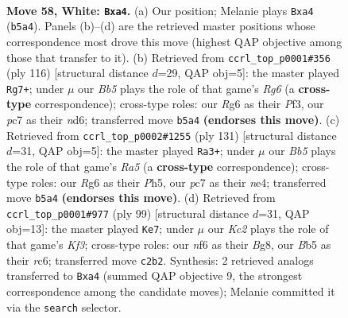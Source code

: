 \documentclass[11pt]{article}
\begin{document}
\clearpage

\begin{figure}[p]\centering
\begin{subfigure}{0.46\textwidth}\centering
\resizebox{\linewidth}{!}{%
\newchessgame
\chessboard[
  setfen={2k5/p1p5/5nR1/1B3p2/r4P2/4B3/2K4P/8 w - - 2 58},
  showmover=false,
  pgfstyle=straightmove, color=movearrow, markmove={b5-a4}
]}
\caption{}
\end{subfigure}\hfill
\begin{subfigure}{0.46\textwidth}\centering
\resizebox{\linewidth}{!}{%
\newchessgame
\chessboard[
  setfen={8/p1k5/P2n2R1/r5p1/8/5P2/7K/5B2 w - - 18 59},
  showmover=false,
  pgfstyle=straightmove, color=movearrow, markmove={g6-g7}
]}
\caption{}
\end{subfigure}
\\[4pt]
\begin{subfigure}{0.46\textwidth}\centering
\resizebox{\linewidth}{!}{%
\newchessgame
\chessboard[
  setfen={8/2P2R2/2k5/7p/r3N1bP/4KpP1/8/8 b - - 18 66},
  showmover=false,
  pgfstyle=straightmove, color=movearrow, markmove={a4-a3}
]}
\caption{}
\end{subfigure}\hfill
\begin{subfigure}{0.46\textwidth}\centering
\resizebox{\linewidth}{!}{%
\newchessgame
\chessboard[
  setfen={6b1/8/2R2k2/p4P2/2P1K2p/4B3/2P5/3r4 b - - 1 50},
  showmover=false,
  pgfstyle=straightmove, color=movearrow, markmove={f6-e7}
]}
\caption{}
\end{subfigure}
\caption{\textbf{Move 58, White: \texttt{Bxa4}.} (a) Our position; Melanie plays \texttt{Bxa4} (\texttt{b5a4}). Panels (b)--(d) are the retrieved master positions whose correspondence most drove this move (highest QAP objective among those that transfer to it). (b) Retrieved from \texttt{ccrl\_top\_p0001\#356} (ply 116) [structural distance $d$=29, QAP obj=5]: the master played \texttt{Rg7+}; under $\mu$ our \emph{Bb5} plays the role of that game's \emph{Rg6} (a \textbf{cross-type} correspondence); cross-type roles: our \emph{R}g6 as their \emph{P}f3, our \emph{p}c7 as their \emph{n}d6; transferred move \texttt{b5a4} \textbf{(endorses this move)}. (c) Retrieved from \texttt{ccrl\_top\_p0002\#1255} (ply 131) [structural distance $d$=31, QAP obj=5]: the master played \texttt{Ra3+}; under $\mu$ our \emph{Bb5} plays the role of that game's \emph{Ra5} (a \textbf{cross-type} correspondence); cross-type roles: our \emph{R}g6 as their \emph{P}h5, our \emph{p}c7 as their \emph{n}e4; transferred move \texttt{b5a4} \textbf{(endorses this move)}. (d) Retrieved from \texttt{ccrl\_top\_p0001\#977} (ply 99) [structural distance $d$=31, QAP obj=13]: the master played \texttt{Ke7}; under $\mu$ our \emph{Kc2} plays the role of that game's \emph{Kf3}; cross-type roles: our \emph{n}f6 as their \emph{B}g8, our \emph{B}b5 as their \emph{r}c6; transferred move \texttt{c2b2}. Synthesis: 2 retrieved analogs transferred to \texttt{Bxa4} (summed QAP objective 9, the strongest correspondence among the candidate moves); Melanie committed it via the \texttt{search} selector.}
\label{fig:thought-m114}
\end{figure}
\end{document}

